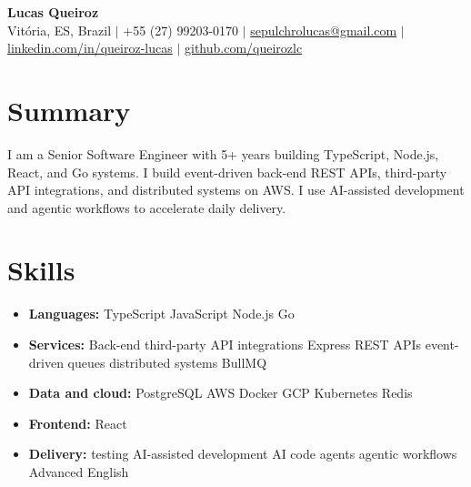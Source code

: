 \documentclass[letterpaper,10pt]{article}
\newcommand{\resumeItem}[1]{\item\small{#1}}
\newcommand{\resumeSubHeadingList}{\begin{itemize}[leftmargin=0.15in, label={}, nosep]}
\newcommand{\resumeSubHeadingListEnd}{\end{itemize}}
\begin{document}
\begin{center}
  \textbf{\Huge Lucas Queiroz} \\[3pt]
  \small Vit\'oria, ES, Brazil $|$ +55 (27) 99203-0170 $|$ \href{mailto:sepulchrolucas@gmail.com}{sepulchrolucas@gmail.com} $|$
  \href{https://linkedin.com/in/queiroz-lucas}{linkedin.com/in/queiroz-lucas} $|$
  \href{https://github.com/queirozlc}{github.com/queirozlc}
\end{center}
\vspace{2pt}

\section{Summary}
I am a Senior Software Engineer with 5+ years building TypeScript, Node.js, React, and Go systems. I build event-driven back-end REST APIs, third-party API integrations, and distributed systems on AWS. I use AI-assisted development and agentic workflows to accelerate daily delivery.

\section{Skills}
\resumeSubHeadingList
\resumeItem{\textbf{Languages:} TypeScript \textbar{} JavaScript \textbar{} Node.js \textbar{} Go}
\resumeItem{\textbf{Services:} Back-end \textbar{} third-party API integrations \textbar{} Express \textbar{} REST APIs \textbar{} event-driven \textbar{} queues \textbar{} distributed systems \textbar{} BullMQ}
\resumeItem{\textbf{Data and cloud:} PostgreSQL \textbar{} AWS \textbar{} Docker \textbar{} GCP \textbar{} Kubernetes \textbar{} Redis}
\resumeItem{\textbf{Frontend:} React}
\resumeItem{\textbf{Delivery:} testing \textbar{} AI-assisted development \textbar{} AI code agents \textbar{} agentic workflows \textbar{} Advanced English}
\resumeSubHeadingListEnd
\end{document}
